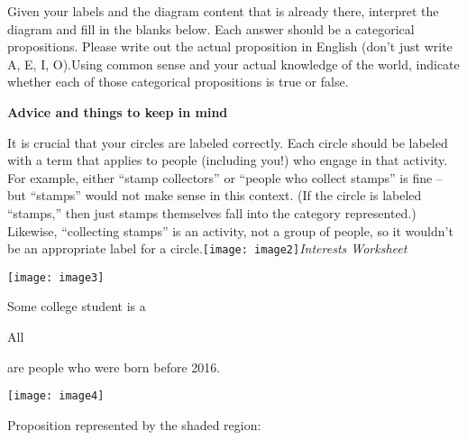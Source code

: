 \documentclass[oneside, openany]{book} %
\begin{document}
\noindent

\noindent Given your labels and the diagram content that is already there, interpret the diagram and fill in the blanks below. Each answer should be a categorical propositions. Please 
write out the actual proposition in English (don't just write A, E, I, O).Using common sense and your actual knowledge of the world, indicate whether each of those categorical 
propositions is true or false.

\noindent

\noindent

\noindent \textbf{Advice and things to keep in mind}

\noindent

\noindent

\noindent

\noindent It is crucial that your circles are labeled correctly. Each circle should be labeled with a term that applies to people (including you!) who engage in that activity. For 
example, either ``stamp collectors'' or ``people who collect stamps'' is fine -- but ``stamps'' would not make sense in this context. (If the circle is labeled ``stamps,'' then just 
stamps themselves fall into the category represented.) Likewise, ``collecting stamps'' is an activity, not a group of people, so it wouldn't be an appropriate label for a 
circle.\texttt{[image: image2]}\textit{Interests Worksheet}

\noindent

\noindent

\noindent

\noindent \texttt{[image: image3]}

\noindent

\noindent

\noindent Some college student is a \underbar{ }

\noindent All \underbar{ }

\noindent are people who were born before 2016.

\noindent

\noindent

\noindent

\noindent \texttt{[image: image4]}

\noindent

\noindent

\noindent Proposition represented by the shaded region:
\end{document}
